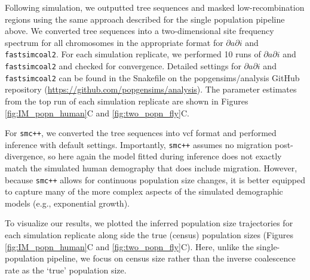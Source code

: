 \documentclass[12pt,halfline,a4paper]{ouparticle}
\newcommand{\dadi}{$\partial a \partial i$\xspace}
\newcommand{\smcpp}{\texttt{smc++}\xspace}
\newcommand{\fastsimcoal}{\texttt{fastsimcoal2}\xspace}
\begin{document}
Following simulation, we outputted tree sequences and masked low-recombination
regions using the same approach described for the single population pipeline above. We
converted tree sequences into a two-dimensional site frequency spectrum for all
chromosomes in the appropriate format for \dadi and \fastsimcoal. For each simulation
replicate, we performed 10 runs of \dadi and \fastsimcoal and checked for convergence.
Detailed settings for \dadi and \fastsimcoal can be found in the Snakefile
on the popgensims/analysis GitHub repository (\url{https://github.com/popgensims/analysis}).
The parameter estimates from the top run of each simulation replicate
are shown in Figures \ref{fig:IM_popn_human}C and \ref{fig:two_popn_fly}C.

For \smcpp , we converted the tree sequences into vcf format and performed inference
with default settings. Importantly, \smcpp assumes no migration post-divergence, so
here again the model fitted during inference does not exactly match the simulated
human demography that does include migration. However, because \smcpp allows
for continuous population size changes, it is better equipped to capture many of the
more complex aspects of the simulated demographic models (e.g., exponential growth).

To visualize our results, we plotted the inferred population size trajectories
for each simulation replicate along side the true (census) population sizes
(Figures \ref{fig:IM_popn_human}C and \ref{fig:two_popn_fly}C). Here, unlike the single-population pipeline,
we focus on census size rather than the inverse coalescence rate as the `true' population size.
\end{document}
